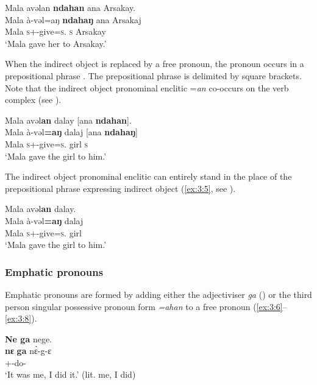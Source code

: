 \ea \label{ex:3:3}
Mala  avəlan  \textbf{ndahan} ana  Arsakay.\\
\gll  Mala à-vəl=aŋ     \textbf{ndahaŋ}   ana   Arsakaj\\
      Mala  \textsc{s}+{\PFV}-give=\textsc{s}.{\IO}    \textsc{s}  {\DAT} Arsakay\\
\glt ‘Mala gave her to Arsakay.’
\z

When the indirect object is replaced by a free pronoun, the pronoun occurs in a prepositional phrase . The prepositional phrase is delimited by square brackets. Note that the indirect object pronominal enclitic =\textit{an} co-occurs on the verb complex (see ).
\newpage

\ea \label{ex:3:4}
Mala  avəl\textbf{an} dalay  [ana  \textbf{ndahan}].\\
\gll  Mala   à-vəl\textbf{=aŋ}     dalaj   [ana   \textbf{ndahaŋ}]\\
      Mala  \textsc{s}+{\PFV}-give=\textsc{s}.{\IO}    girl  {\DAT} \textsc{s}\\
\glt  ‘Mala gave the girl to him.’
\z

The indirect object pronominal enclitic can entirely stand in the place of the prepositional phrase expressing indirect object (\ref{ex:3:5}, see ).

\ea \label{ex:3:5}
Mala  avəl\textbf{an} dalay.\\
\gll  Mala   à-vəl\textbf{=aŋ}     dalaj\\
       Mala  \textsc{s}+{\PFV}-give=\textsc{s}.{\IO}    girl\\
\glt  ‘Mala gave the girl to him.’
\z

\subsubsection{Emphatic pronouns}\label{sec:3.1.1.2}

Emphatic pronouns are formed by adding either the adjectiviser \textit{ga} () or the third person singular possessive pronoun form \textit{=ahan} to a free pronoun (\ref{ex:3:6}--\ref{ex:3:8}). 

\ea \label{ex:3:6}
\textbf{Ne  ga}  nege.\\
\gll  \textbf{nɛ}  \textbf{ga}     n\`{ɛ}-g-ɛ\\
      {\oneS}  {\ADJ}    {\oneS}+{\PFV}-do-{\CL}\\
\glt  ‘It was me, I did it.’ (lit. me, I did)
\z

